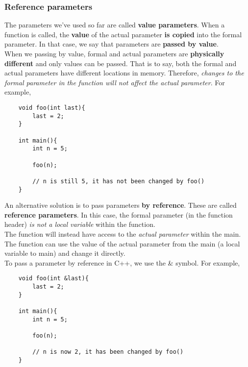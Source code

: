 \documentclass[]{article}
\begin{document}
\subsubsection{Reference parameters}
\bigbreak

The parameters we've used so far are called \textbf{value parameters}. When a function is called, the \textbf{value} of the actual parameter \textbf{is copied} into the formal parameter. In that case, we say that parameters are \textbf{passed by value}.\\

When we passing by value, formal and actual parameters are \textbf{physically different} and only values can be passed. That is to say, both the formal and actual parameters have different locations in memory. Therefore, \textit{changes to the formal parameter in the function will not affect the actual parameter}. For example, \\

\begin{lstlisting}
	void foo(int last){
		last = 2;
	}
	
	int main(){
		int n = 5;
		
		foo(n);
		
		// n is still 5, it has not been changed by foo()
	}
\end{lstlisting}\bigbreak



An alternative solution is to pass parameters \textbf{by reference}. These are called \textbf{reference parameters}. In this case, the formal parameter (in the function header) \textit{is not a local variable} within the function.\\

The function will instead have access to the \textit{actual parameter} within the main. The function can use the value of the actual parameter from the main (a local variable to main) and change it directly. \\

To pass a parameter by reference in C++, we use the \& symbol. For example,\\


\begin{lstlisting}
	void foo(int &last){
		last = 2;
	}
	
	int main(){
		int n = 5;
		
		foo(n);
		
		// n is now 2, it has been changed by foo()
	}
\end{lstlisting}\bigbreak
\end{document}
